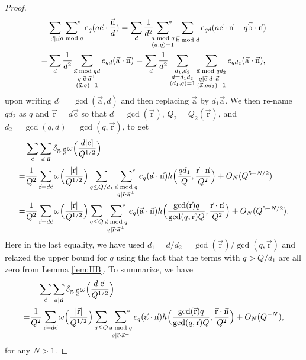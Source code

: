 \documentclass[letterpaper,11pt]{amsart}
\numberwithin{equation}{section}
\theoremstyle{definition}
\numberwithin{equation}{section}
\renewcommand{\d}{\mathbf{d}}
\newcommand{\starsum}{\sideset{}{^*}\sum}
\newcommand{\ua}{\vec{\mathrm{a}}}
\newcommand{\ub}{\vec{\mathrm{b}}}
\newcommand{\ur}{\vec{\mathrm{r}}}
\newcommand{\uc}{{\vec{\mathrm{c}}}}
\newcommand{\nn}{\vec{\mathrm{n}}}
\begin{document}
\begin{proof}
\begin{align*}
	&\sum_{d\mid \nn}\starsum_{a\bmod q}e_q(a\uc\cdot \frac{\nn}{d})=\sum_{d}\frac{1}{d^2}\starsum_{\substack{a\bmod q\\ (a, q)=1}}\sum_{\ub\bmod d}e_{qd}(a\uc\cdot \nn+q\ub\cdot\nn)
	\\=&\sum_{d}\frac{1}{d^2}\sum_{\substack{\ua \bmod {qd}\\ q\mid \uc \cdot \ua^\perp\\ (\ua, q)=1}}e_{qd}(\ua \cdot \nn) =\sum_{d}
    \frac{1}{d^2}
\sum_{\substack{d_1,d_2\\d=d_1d_2\\ (d_1, q)=1}}
\sum_{\substack{\ua \bmod qd_2\\ q\mid \uc\cdot d_1\ua ^\perp\\ (\ua, qd_2)=1}}e_{qd_2}(\ua\cdot \nn),
	\end{align*}
	upon writing $d_1=\gcd(\ua, d)$ and then replacing $\ua$ by $d_1\ua$.
	We then re-name $qd_2$ as $q$ and $\ur =d\uc$ so that $d=\gcd(\ur)$, $Q_2=Q_2(\ur)$, and $d_2=\gcd(q, d)=\gcd(q,\ur)$,  to get 
	\begin{align*}
	&\sum_{\uc}\sum_{d\mid \nn}\delta_{\uc \cdot \frac{\nn}{d}}\omega\Big(\frac{d|\uc|}{Q^{1/2}}\Big)\\=&\frac{1}{Q^2}\sum_{\ur=d \uc}\omega\Big(\frac{|\ur|}{Q^{1/2}}\Big)\sum_{q\leq Q/d_1}\;\starsum_{\substack{\ua \bmod q\\ q\mid \ur\cdot \ua^\perp}}e_{q}(\ua\cdot \nn)h\Big(\frac{qd_1}{Q}, \frac{\ur\cdot \nn}{Q^2}\Big)+O_N(Q^{5-N/2})\\
    =&\frac{1}{Q^2}\sum_{\ur=d \uc}\omega\Big(\frac{|\ur|}{Q^{1/2}}\Big)\sum_{\substack{q\leq Q}}\;\starsum_{\substack{\ua \bmod q\\ q\mid \ur\cdot \ua^\perp}}e_{q}(\ua\cdot \nn)h\Big(\frac{\gcd(\ur)q}{\gcd(q,\ur)Q}, \frac{\ur\cdot \nn}{Q^2}\Big)+O_N(Q^{5-N/2}).
	\end{align*}
    Here in the last equality, we have used $d_1=d/d_2=\gcd(\ur)/\gcd(q,\ur)$ and relaxed the upper bound for $q$ using the fact that the terms with $q>Q/d_1$ are all zero from Lemma \ref{lem:HB}. 
    To summarize, we have
	\begin{align}
    \label{eq:second-identity}
	&\quad \sum_{\uc}\sum_{d\mid \nn}\delta_{\uc \cdot \frac{\nn}{d}}\omega\Big(\frac{d|\uc|}{Q^{1/2}}\Big)\\=&\frac{1}{Q^2}\sum_{\ur=d \uc}\omega\Big(\frac{|\ur|}{Q^{1/2}}\Big)\sum_{\substack{q\leq Q}}\;\starsum_{\substack{\ua \bmod q\\ q\mid \ur\cdot \ua^\perp}}e_{q}(\ua\cdot \nn)h\Big(\frac{\gcd(\ur)q}{\gcd(q, \ur)Q}, \frac{\ur\cdot \nn}{Q^2}\Big)+O_N(Q^{-N}),\nonumber
	\end{align} 
    for any $N>1$.


\end{proof}
\end{document}
